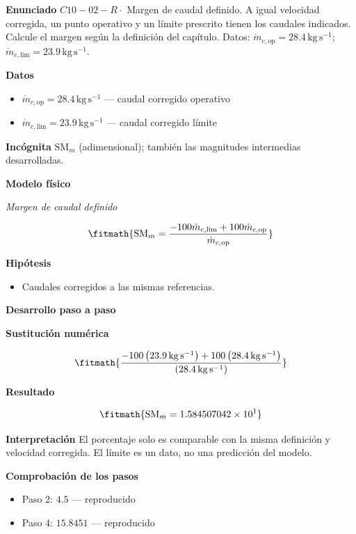 \documentclass[10pt,openany]{book}
\begin{document}
\begin{tcolorbox}[title={Problema resuelto 2}, studiumworked, breakable]

\noindent\textbf{Enunciado}
\(C10-02-R \cdot\) Margen de caudal definido. A igual velocidad corregida, un punto operativo y un límite prescrito tienen los caudales indicados. Calcule el margen según la definición del capítulo. Datos: \(\dot{m}_{c,\mathrm{op}}=28.4\, \mathrm{kg}\,\mathrm{s}^{-1}\); \(\dot{m}_{c,\mathrm{lim}}=23.9\, \mathrm{kg}\,\mathrm{s}^{-1}\).

\noindent\textbf{Datos}
\begin{itemize}
\item $\dot{m}_{c,\mathrm{op}} = 28.4\,\mathrm{kg}\,\mathrm{s}^{-1}$ — caudal corregido operativo
\item $\dot{m}_{c,\mathrm{lim}} = 23.9\,\mathrm{kg}\,\mathrm{s}^{-1}$ — caudal corregido límite
\end{itemize}

\noindent\textbf{Incógnita}
$\mathrm{SM}_m$ (adimensional); también las magnitudes intermedias desarrolladas.

\noindent\textbf{Modelo físico}

\noindent\textit{Margen de caudal definido}

\[
\fitmath{\mathrm{SM}_m=\frac{- 100 \dot{m}_{c,\mathrm{lim}} + 100 \dot{m}_{c,\mathrm{op}}}{\dot{m}_{c,\mathrm{op}}}}
\]

\noindent\textbf{Hipótesis}
\begin{itemize}
\item Caudales corregidos a las mismas referencias.
\end{itemize}

\noindent\textbf{Desarrollo paso a paso}



\noindent\textbf{Sustitución numérica}

\[
\fitmath{\frac{- 100 \left(23.9\,\mathrm{kg}\,\mathrm{s}^{-1}\right) + 100 \left(28.4\,\mathrm{kg}\,\mathrm{s}^{-1}\right)}{\left(28.4\,\mathrm{kg}\,\mathrm{s}^{-1}\right)}}
\]

\noindent\textbf{Resultado}

\[
\fitmath{\mathrm{SM}_m=1.584507042\times10^{1}}
\]

\noindent\textbf{Interpretación}
El porcentaje solo es comparable con la misma definición y velocidad corregida. El límite es un dato, no una predicción del modelo.

\noindent\textbf{Comprobación de los pasos}
\begin{itemize}
\item Paso 2: $4.5$ — reproducido
\item Paso 4: $15.8451$ — reproducido
\end{itemize}


\end{tcolorbox}
\end{document}
